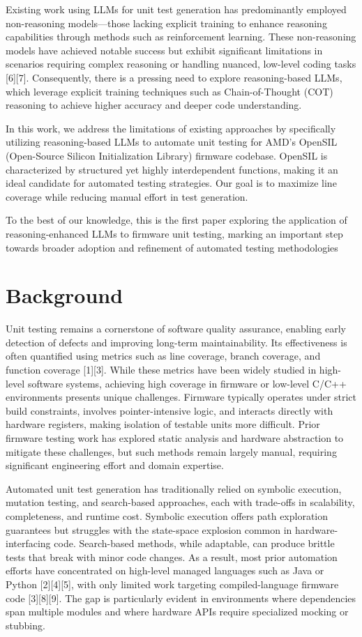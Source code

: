 \documentclass[conference]{IEEEtran}
\begin{document}
Existing work using LLMs for unit test generation has predominantly employed non-reasoning models—those lacking explicit training to enhance reasoning capabilities through methods such as reinforcement learning. These non-reasoning models have achieved notable success but exhibit significant limitations in scenarios requiring complex reasoning or handling nuanced, low-level coding tasks [6][7]. Consequently, there is a pressing need to explore reasoning-based LLMs, which leverage explicit training techniques such as Chain-of-Thought (COT) reasoning to achieve higher accuracy and deeper code understanding. 

In this work, we address the limitations of existing approaches by specifically utilizing reasoning-based LLMs to automate unit testing for AMD’s OpenSIL (Open-Source Silicon Initialization Library) firmware codebase. OpenSIL is characterized by structured yet highly interdependent functions, making it an ideal candidate for automated testing strategies. Our goal is to maximize line coverage while reducing manual effort in test generation.  

To the best of our knowledge, this is the first paper exploring the application of reasoning-enhanced LLMs to firmware unit testing, marking an important step towards broader adoption and refinement of automated testing methodologies

\section{Background}
Unit testing remains a cornerstone of software quality assurance, enabling early detection of defects and improving long-term maintainability. Its effectiveness is often quantified using metrics such as line coverage, branch coverage, and function coverage [1][3]. While these metrics have been widely studied in high-level software systems, achieving high coverage in firmware or low-level C/C++ environments presents unique challenges. Firmware typically operates under strict build constraints, involves pointer-intensive logic, and interacts directly with hardware registers, making isolation of testable units more difficult. Prior firmware testing work has explored static analysis and hardware abstraction to mitigate these challenges, but such methods remain largely manual, requiring significant engineering effort and domain expertise. 

Automated unit test generation has traditionally relied on symbolic execution, mutation testing, and search-based approaches, each with trade-offs in scalability, completeness, and runtime cost. Symbolic execution offers path exploration guarantees but struggles with the state-space explosion common in hardware-interfacing code. Search-based methods, while adaptable, can produce brittle tests that break with minor code changes. As a result, most prior automation efforts have concentrated on high-level managed languages such as Java or Python [2][4][5], with only limited work targeting compiled-language firmware code [3][8][9]. The gap is particularly evident in environments where dependencies span multiple modules and where hardware APIs require specialized mocking or stubbing. 
\end{document}
